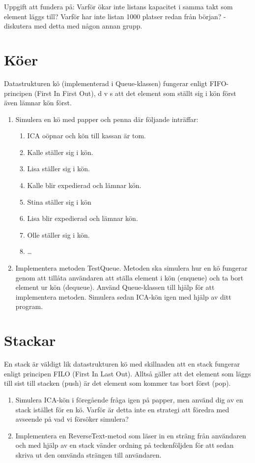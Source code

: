 \documentclass{article}
\begin{document}
  
 Uppgift att fundera på: Varför ökar inte listans kapacitet i samma takt som element läggs till? Varför har inte listan 1000 platser redan från början? - diskutera med detta med någon annan grupp. 

  \section*{Köer}
  Datastrukturen kö (implementerad i Queue-klassen) fungerar enligt FIFO-principen (First
  In First Out), d v s att det element som ställt sig i kön först även lämnar kön först.

  \begin{enumerate}
      \item Simulera en kö med papper och penna där följande inträffar:
	      \begin{enumerate}
	          \item ICA oöpnar och kön till kassan är tom.
	          \item Kalle ställer sig i kön.
	          \item Lisa ställer sig i kön.
	          \item Kalle blir expedierad och lämnar kön.
	          \item Stina ställer sig i kön
	          \item Lisa blir expedierad och lämnar kön.
	          \item Olle ställer sig i kön.
	          \item \ldots
	      \end{enumerate}
      \item Implementera metoden TestQueue. Metoden ska simulera hur en kö fungerar genom
      att tillåta användaren att ställa element i kön (enqueue) och ta bort element ur kön
      (dequeue). Använd Queue-klassen till hjälp för att implementera metoden. Simulera
      sedan ICA-kön igen med hjälp av ditt program.
    \end{enumerate}
  \section*{Stackar}
  En stack är väldigt lik datastrukturen kö med skillnaden att en stack fungerar enligt principen FILO (First In Last Out). Alltså gäller att det element som läggs till sist till stacken (push) är det element som kommer tas bort först (pop).
  \begin{enumerate}
  	          \item Simulera ICA-kön i föregående fråga igen på papper, men använd dig av en stack istället för en kö. Varför är detta inte en strategi att föredra med avseende på vad vi försöker simulera?
  	          \item Implementera en ReverseText-metod som läser in en sträng från användaren och med hjälp av en stack vänder ordning på teckenföljden för att sedan skriva ut den omvända strängen till användaren.	          
   \end{enumerate}
   \newpage
\end{document}
